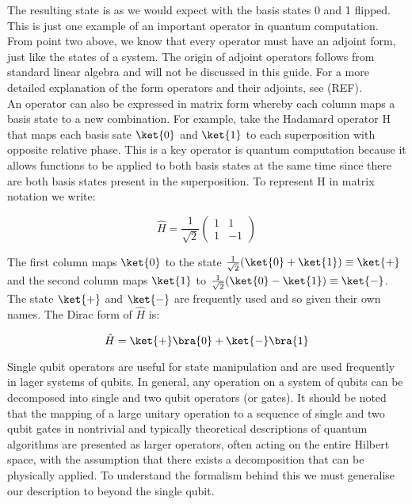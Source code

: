 The resulting state is as we would expect with the basis states 0 and 1 flipped. This is just one example of an important operator in quantum computation. From point two above, we know that every operator must have an adjoint form, just like the states of a system. The origin of adjoint operators follows from standard linear algebra and will not be discussed in this guide. For a more detailed explanation of the form operators and their adjoints, see (REF). \\

An operator can also be expressed in matrix form whereby each column maps a basis state to a new combination. For example, take the Hadamard operator H that maps each basis sate $\ket{0}$ and $\ket{1}$ to each superposition with opposite relative phase. This is a key operator is quantum computation because it allows functions to be applied to both basis states at the same time since there are both basis states present in the superposition. To represent H in matrix notation we write:

\begin{equation}
    \hat{H} = \frac{1}{\sqrt{2}}\begin{pmatrix}1 & 1\\
    1 & -1\end{pmatrix}
\end{equation}

The first column maps $\ket{0}$ to the state $\frac{1}{\sqrt{2}}(\ket{0}+\ket{1})\equiv\ket{+}$ and the second column maps $\ket{1}$ to $\frac{1}{\sqrt{2}}(\ket{0}-\ket{1})\equiv\ket{-}$. The state $\ket{+}$ and $\ket{-}$ are frequently used and so given their own names. The Dirac form of $\hat{H}$ is:

\begin{equation}
    \hat{H}=\ket{+}\bra{0}+\ket{-}\bra{1}
\end{equation}

Single qubit operators are useful for state manipulation and are used frequently in lager systems of qubits. In general, any operation on a system of qubits can be decomposed into single and two qubit operators (or gates). It should be noted that the mapping of a large unitary operation to a sequence of single and two qubit gates in nontrivial and typically theoretical descriptions of quantum algorithms are presented as larger operators, often acting on the entire Hilbert space, with the assumption that there exists a decomposition  that can be physically applied. To understand the formalism behind this we must generalise our description to beyond the single qubit.

